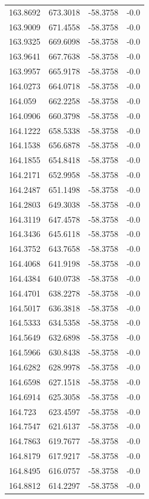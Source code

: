 \begin{table}[H]
\begin{tabular}{llll}
163.8692 & 673.3018 & -58.3758 & -0.0 \\
163.9009 & 671.4558 & -58.3758 & -0.0 \\
163.9325 & 669.6098 & -58.3758 & -0.0 \\
163.9641 & 667.7638 & -58.3758 & -0.0 \\
163.9957 & 665.9178 & -58.3758 & -0.0 \\
164.0273 & 664.0718 & -58.3758 & -0.0 \\
164.059 & 662.2258 & -58.3758 & -0.0 \\
164.0906 & 660.3798 & -58.3758 & -0.0 \\
164.1222 & 658.5338 & -58.3758 & -0.0 \\
164.1538 & 656.6878 & -58.3758 & -0.0 \\
164.1855 & 654.8418 & -58.3758 & -0.0 \\
164.2171 & 652.9958 & -58.3758 & -0.0 \\
164.2487 & 651.1498 & -58.3758 & -0.0 \\
164.2803 & 649.3038 & -58.3758 & -0.0 \\
164.3119 & 647.4578 & -58.3758 & -0.0 \\
164.3436 & 645.6118 & -58.3758 & -0.0 \\
164.3752 & 643.7658 & -58.3758 & -0.0 \\
164.4068 & 641.9198 & -58.3758 & -0.0 \\
164.4384 & 640.0738 & -58.3758 & -0.0 \\
164.4701 & 638.2278 & -58.3758 & -0.0 \\
164.5017 & 636.3818 & -58.3758 & -0.0 \\
164.5333 & 634.5358 & -58.3758 & -0.0 \\
164.5649 & 632.6898 & -58.3758 & -0.0 \\
164.5966 & 630.8438 & -58.3758 & -0.0 \\
164.6282 & 628.9978 & -58.3758 & -0.0 \\
164.6598 & 627.1518 & -58.3758 & -0.0 \\
164.6914 & 625.3058 & -58.3758 & -0.0 \\
164.723 & 623.4597 & -58.3758 & -0.0 \\
164.7547 & 621.6137 & -58.3758 & -0.0 \\
164.7863 & 619.7677 & -58.3758 & -0.0 \\
164.8179 & 617.9217 & -58.3758 & -0.0 \\
164.8495 & 616.0757 & -58.3758 & -0.0 \\
164.8812 & 614.2297 & -58.3758 & -0.0 \\

\end{tabular}
\end{table}
